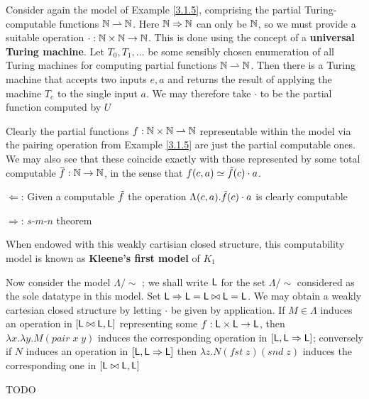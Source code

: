 \documentclass[11pt]{article}
\begin{document}
\begin{examplle}[]
Consider again the model of Example \ref{3.1.5}, comprising the partial Turing-computable
functions \(\mathbb{N}\rightharpoonup\mathbb{N}\). Here \(\mathbb{N}\Rightarrow\mathbb{N}\) can only be \(\mathbb{N}\), so we must provide a suitable
operation \(\cdot:\mathbb{N}\times\mathbb{N}\to\mathbb{N}\). This is done using the concept of a \textbf{universal Turing machine}.
Let \(T_0, T_1,\dots\)  be some sensibly chosen enumeration of all Turing machines for computing
partial functions \(\mathbb{N}\rightharpoonup\mathbb{N}\). Then there is a Turing machine that accepts two inputs \(e,a\) and
returns the result of applying the machine \(T_e\) to the single input \(a\). We may therefore
take \(\cdot\) to be the partial function computed by \(U\)

Clearly the partial functions \(f:\mathbb{N}\times\mathbb{N}\rightharpoonup\mathbb{N}\)  representable within the model via the pairing
operation from Example \ref{3.1.5} are just the partial computable ones. We may also see that
these coincide exactly with those represented by some total computable \(\barf:\N\to\N\), in the
sense that \(f(c,a)\simeq\tilde{f}(c)\cdot a\).

\(\Leftarrow\): Given a computable \(\tilde{f}\) the operation \(\Lambda(c,a).\tilde{f}(c)\cdot a\) is clearly computable

\(\Rightarrow\): \(s\)-\(m\)-\(n\) theorem

When endowed with this weakly cartisian closed structure, this computability model is known as
\textbf{Kleene's first model} of \(K_1\)
\end{examplle}

\begin{examplle}[]
\label{3.1.10}
Now consider the model \(\Lambda/\sim\) ; we shall write \(\textsf{L}\) for the set \(\Lambda/\sim\) considered as the
sole datatype in this model. Set \(\textsf{L}\Rightarrow\textsf{L}=\textsf{L}\bowtie\textsf{L}=\textsf{L}\). We may obtain a weakly cartesian
closed structure by letting \(\cdot\) be given by application. If \(M\in\Lambda\) induces an operation
in \([\textsf{L}\bowtie \textsf{L},\textsf{L}]\) representing some \(f:\textsf{L}\times\textsf{L}\to\textsf{L}\), then \(\lambda x.\lambda y.M(pair\;x\;y)\)
induces the corresponding operation in \([\textsf{L},\textsf{L}\Rightarrow\textsf{L}]\); conversely if \(N\) induces an
operation in \([\textsf{L},\textsf{L}\Rightarrow\textsf{L}]\) then \(\lambda z.N(fst\;z)(snd\;z)\) induces the corresponding one
in \([\textsf{L}\bowtie\textsf{L},\textsf{L}]\)
\end{examplle}
TODO
\begin{examplle}[]

\end{examplle}
\end{document}
